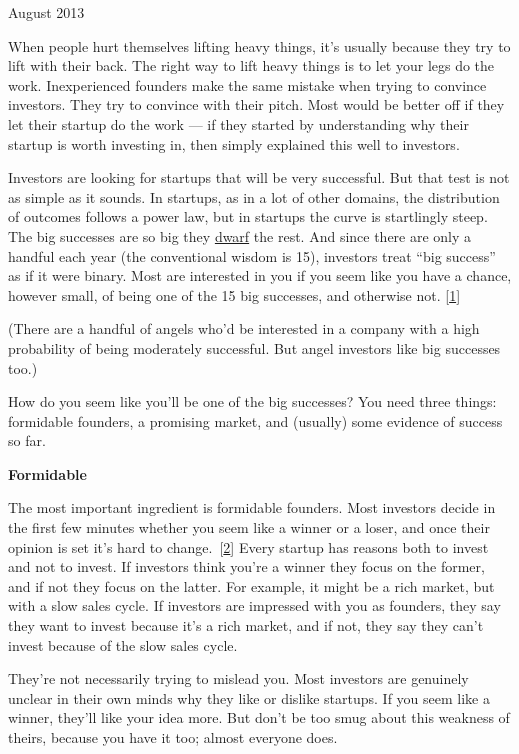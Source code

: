 August 2013

When people hurt themselves lifting heavy things, it's usually because
they try to lift with their back. The right way to lift heavy things is
to let your legs do the work. Inexperienced founders make the same
mistake when trying to convince investors. They try to convince with
their pitch. Most would be better off if they let their startup do the
work --- if they started by understanding why their startup is worth
investing in, then simply explained this well to investors.

Investors are looking for startups that will be very successful. But
that test is not as simple as it sounds. In startups, as in a lot of
other domains, the distribution of outcomes follows a power law, but in
startups the curve is startlingly steep. The big successes are so big
they \href{swan.html}{dwarf} the rest. And since there are only a
handful each year (the conventional wisdom is 15), investors treat ``big
success'' as if it were binary. Most are interested in you if you seem
like you have a chance, however small, of being one of the 15 big
successes, and otherwise not. {[}\hyperref[f1n]{1}{]}

(There are a handful of angels who'd be interested in a company with a
high probability of being moderately successful. But angel investors
like big successes too.)

How do you seem like you'll be one of the big successes? You need three
things: formidable founders, a promising market, and (usually) some
evidence of success so far.

\textbf{Formidable}

The most important ingredient is formidable founders. Most investors
decide in the first few minutes whether you seem like a winner or a
loser, and once their opinion is set it's hard to
change.~{[}\hyperref[f2n]{2}{]} Every startup has reasons both to invest
and not to invest. If investors think you're a winner they focus on the
former, and if not they focus on the latter. For example, it might be a
rich market, but with a slow sales cycle. If investors are impressed
with you as founders, they say they want to invest because it's a rich
market, and if not, they say they can't invest because of the slow sales
cycle.

They're not necessarily trying to mislead you. Most investors are
genuinely unclear in their own minds why they like or dislike startups.
If you seem like a winner, they'll like your idea more. But don't be too
smug about this weakness of theirs, because you have it too; almost
everyone does.

